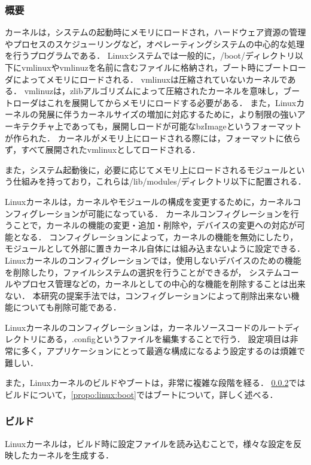 \documentclass[graduation-thesis]{mlarticle}
\begin{document}
\subsubsection{概要}
\label{propo:linux:abstruction}
カーネルは，システムの起動時にメモリにロードされ，ハードウェア資源の管理やプロセスのスケジューリングなど，オペレーティングシステムの中心的な処理を行うプログラムである．
Linuxシステムでは一般的に，/boot/ディレクトリ以下にvmlinuxやvmlinuzを名前に含むファイルに格納され，ブート時にブートローダによってメモリにロードされる．
vmlinuxは圧縮されていないカーネルである．
vmlinuzは，zlibアルゴリズムによって圧縮されたカーネルを意味し，ブートローダはこれを展開してからメモリにロードする必要がある．
また，Linuxカーネルの発展に伴うカーネルサイズの増加に対応するために，より制限の強いアーキテクチャ上であっても，展開しロードが可能なbzImageというフォーマットが作られた．
カーネルがメモリ上にロードされる際には，フォーマットに依らず，すべて展開されたvmlinuxとしてロードされる．

また，システム起動後に，必要に応じてメモリ上にロードされるモジュールという仕組みを持っており，これらは/lib/modules/ディレクトリ以下に配置される．

Linuxカーネルは，カーネルやモジュールの構成を変更するために，カーネルコンフィグレーションが可能になっている．
カーネルコンフィグレーションを行うことで，カーネルの機能の変更・追加・削除や，デバイスの変更への対応が可能となる．
コンフィグレーションによって，カーネルの機能を無効にしたり，モジュールとして外部に置きカーネル自体には組み込まないように設定できる．
Linuxカーネルのコンフィグレーションでは，使用しないデバイスのための機能を削除したり，ファイルシステムの選択を行うことができるが，
システムコールやプロセス管理などの，カーネルとしての中心的な機能を削除することは出来ない．
本研究の提案手法では，コンフィグレーションによって削除出来ない機能についても削除可能である．

Linuxカーネルのコンフィグレーションは，カーネルソースコードのルートディレクトリにある，.configというファイルを編集することで行う．
設定項目は非常に多く，アプリケーションにとって最適な構成になるよう設定するのは煩雑で難しい．

また，Linuxカーネルのビルドやブートは，非常に複雑な段階を経る．
\ref{propo:linux:compile}ではビルドについて，\ref{propo:linux:boot}ではブートについて，詳しく述べる．

\subsubsection{ビルド}
\label{propo:linux:compile}
Linuxカーネルは，ビルド時に設定ファイルを読み込むことで，様々な設定を反映したカーネルを生成する．
\end{document}
